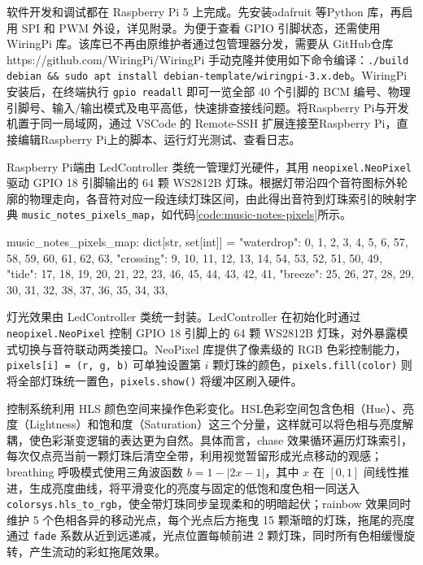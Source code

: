 \documentclass[bachelor]{njupthesis}
\begin{document}
软件开发和调试都在 Raspberry Pi 5 上完成。先安装adafruit 等Python 库，再启用 SPI 和 PWM 外设，详见附录。为便于查看 GPIO 引脚状态，还需使用WiringPi 库。该库已不再由原维护者通过包管理器分发，需要从 GitHub仓库 https://github.com/WiringPi/WiringPi 手动克隆并使用如下命令编译：\texttt{./build debian \&\& sudo apt install debian-template/wiringpi-3.x.deb}。WiringPi 安装后，在终端执行 \texttt{gpio readall} 即可一览全部 40 个引脚的 BCM 编号、物理引脚号、输入/输出模式及电平高低，快速排查接线问题。将Raspberry Pi与开发机置于同一局域网，通过 VSCode 的 Remote-SSH 扩展连接至Raspberry Pi，直接编辑Raspberry Pi上的脚本、运行灯光测试、查看日志。

Raspberry Pi端由 LedController 类统一管理灯光硬件，其用 \texttt{neopixel.NeoPixel} 驱动 GPIO 18 引脚输出的 64 颗 WS2812B 灯珠。根据灯带沿四个音符图标外轮廓的物理走向，各音符对应一段连续灯珠区间，由此得出音符到灯珠索引的映射字典 \texttt{music\_notes\_pixels\_map}，如代码\ref{code:music-notes-pixels}所示。

\begin{code}
\caption{音符-灯珠索引映射}
\label{code:music-notes-pixels}
\begin{codebox}
music_notes_pixels_map: dict[str, set[int]] = {
    "waterdrop": {0, 1, 2, 3, 4, 5, 6, 57, 58, 59, 60, 61, 62, 63},
    "crossing":  {9, 10, 11, 12, 13, 14, 54, 53, 52, 51, 50, 49},
    "tide":      {17, 18, 19, 20, 21, 22, 23, 46, 45, 44, 43, 42, 41},
    "breeze":    {25, 26, 27, 28, 29, 30, 31, 32, 38, 37, 36, 35, 34, 33},
}
\end{codebox}
\end{code}

灯光效果由 LedController 类统一封装。LedController 在初始化时通过 \texttt{neopixel.NeoPixel} 控制 GPIO 18 引脚上的 64 颗 WS2812B 灯珠，对外暴露模式切换与音符联动两类接口。NeoPixel 库提供了像素级的 RGB 色彩控制能力，\texttt{pixels[i] = (r, g, b)} 可单独设置第 $i$ 颗灯珠的颜色，\texttt{pixels.fill(color)} 则将全部灯珠统一置色，\texttt{pixels.show()} 将缓冲区刷入硬件。

控制系统利用 HLS 颜色空间来操作色彩变化。HSL色彩空间包含色相（Hue）、亮度（Lightness）和饱和度（Saturation）这三个分量，这样就可以将色相与亮度解耦，使色彩渐变逻辑的表达更为自然。具体而言，chase 效果循环遍历灯珠索引，每次仅点亮当前一颗灯珠后清空全带，利用视觉暂留形成光点移动的观感；breathing 呼吸模式使用三角波函数 $b = 1 - |2x - 1|$，其中 $x$ 在 $[0,1]$ 间线性推进，生成亮度曲线，将平滑变化的亮度与固定的低饱和度色相一同送入 \texttt{colorsys.hls\_to\_rgb}，使全带灯珠同步呈现柔和的明暗起伏；rainbow 效果同时维护 5 个色相各异的移动光点，每个光点后方拖曳 15 颗渐暗的灯珠，拖尾的亮度通过 \texttt{fade} 系数从近到远递减，光点位置每帧前进 2 颗灯珠，同时所有色相缓慢旋转，产生流动的彩虹拖尾效果。
\end{document}
